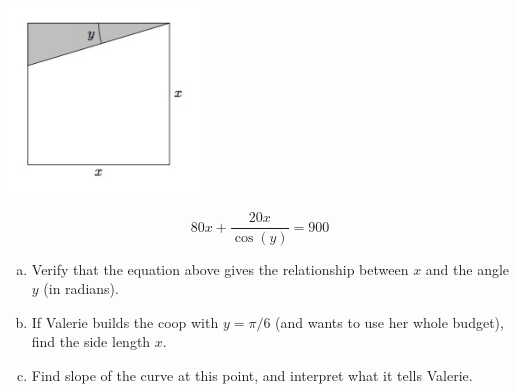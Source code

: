 \documentclass[11pt]{exam}
\begin{document}
\begin{questions}
\includegraphics[width=2in]{coop.jpg}

\vspace*{-2cm}

$$80x + \frac{20x}{\cos(y)}=900$$
\begin{enumerate}[(a)]

\item Verify that the equation above gives the relationship between $x$ and the angle $y$ (in radians).

\vfill


\item If Valerie builds the coop with $y=\pi/6$ (and wants to use her whole budget), find the side length $x$.

\vfill

\item Find slope of the curve at this point, and interpret what it tells Valerie.

\vfill


\end{enumerate}
\end{questions}
\end{document}
